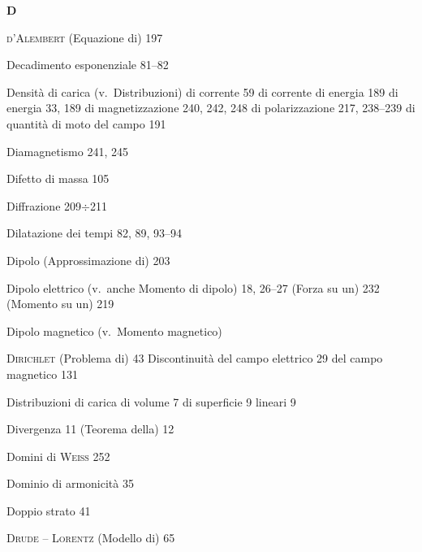 \begin{theindex}
  \indexspace
  \item \textbf{D}
  \indexspace
  \item \textsc{d'Alembert} (Equazione di) 197
  \item Decadimento esponenziale 81--82
  \item Densit\`a
    \subitem di carica (v.\ Distribuzioni)
    \subitem di corrente 59
    \subitem di corrente di energia 189
    \subitem di energia 33, 189
    \subitem di magnetizzazione 240, 242, 248
    \subitem di polarizzazione 217, 238--239
    \subitem di quantit\`a di moto del campo 191
  \item Diamagnetismo 241, 245
  \item Difetto di massa 105
  \item Diffrazione 209$\div$211
  \item Dilatazione dei tempi 82, 89, 93--94
  \item Dipolo (Approssimazione di) 203
  \item Dipolo elettrico (v.\ anche Momento di dipolo) 18, 26--27
    \subitem (Forza su un) 232
    \subitem (Momento su un) 219
  \item Dipolo magnetico (v.\ Momento magnetico)
  \item \textsc{Dirichlet} (Problema di) 43
    \subitem Discontinuit\`a
    \subitem del campo elettrico 29
    \subitem del campo magnetico 131
  \item Distribuzioni di carica
    \subitem di volume 7
    \subitem di superficie 9
    \subitem lineari 9
  \item Divergenza 11
    \subitem (Teorema della) 12
  \item Domini di \textsc{Weiss} 252
  \item Dominio di armonicit\`a 35
  \item Doppio strato 41
  \item \textsc{Drude} -- \textsc{Lorentz} (Modello di) 65


\end{theindex}
